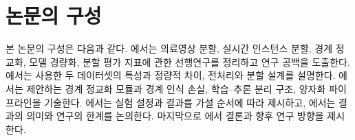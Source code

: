 \section{논문의 구성}\label{sec:organization}

본 논문의 구성은 다음과 같다. 에서는 의료영상 분할, 실시간 인스턴스 분할,
경계 정교화, 모델 경량화, 분할 평가 지표에 관한 선행연구를 정리하고 연구 공백을 도출한다.
에서는 사용한 두 데이터셋의 특성과 정량적 차이, 전처리와 분할 설계를 설명한다.
에서는 제안하는 경계 정교화 모듈과 경계 인식 손실, 학습--추론 분리 구조,
양자화 파이프라인을 기술한다. 에서는 실험 설정과 결과를 가설 순서에 따라
제시하고, 에서는 결과의 의미와 연구의 한계를 논의한다.
마지막으로 에서 결론과 향후 연구 방향을 제시한다.
